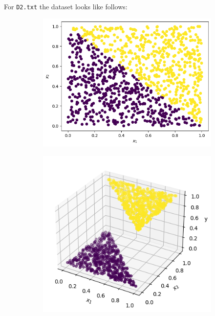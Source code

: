 \documentclass[a4paper]{article}
\theoremstyle{definition}
\newenvironment{soln}{
    \leavevmode\color{blue}\ignorespaces
}{}
\begin{document}
\begin{enumerate}
\begin{itemize}
\begin{soln}
        For \texttt{D2.txt} the dataset looks like follows:
        \begin{figure}[H]
            \begin{subfigure}{0.5\textwidth}
                \centering
                \includegraphics[scale=0.3]{Images/Q6/DTq6d2.png}
            \end{subfigure}%
            \begin{subfigure}{0.5\textwidth}
                \centering
                \includegraphics[scale=0.3]{Images/Q6/DTq6d2_3d.png}
            \end{subfigure}
            \label{fig:q6_d2}
        \end{figure}

\end{soln}
\end{itemize}
\end{enumerate}
\end{document}
